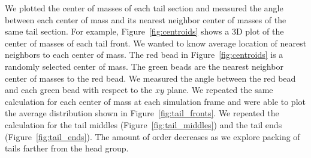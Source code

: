 \documentclass{article}
\begin{document}
  We plotted the center of masses of each tail section and measured the angle 
  between each center of mass and its nearest neighbor center of masses of the
  same tail section. For example, Figure~\ref{fig:centroids} shows a 3D plot of
  the center of masses of each tail front. We wanted to know average location
  of nearest neighbors to each center of mass. The red bead in 
  Figure~\ref{fig:centroids} is a randomly selected center of mass. The
  green beads are the nearest neighbor center of masses to the red bead. We
  measured the angle between the red bead and each green bead with respect to
  the $xy$ plane. We repeated the same calculation for each center of mass at
  each simulation frame and were able to plot the average distribution shown
  in Figure~\ref{fig:tail_fronts}. We repeated the calculation for the tail
  middles (Figure~\ref{fig:tail_middles}) and the tail ends 
  (Figure~\ref{fig:tail_ends}). The amount of order decreases as we explore
  packing of tails farther from the head group.
\end{document}
